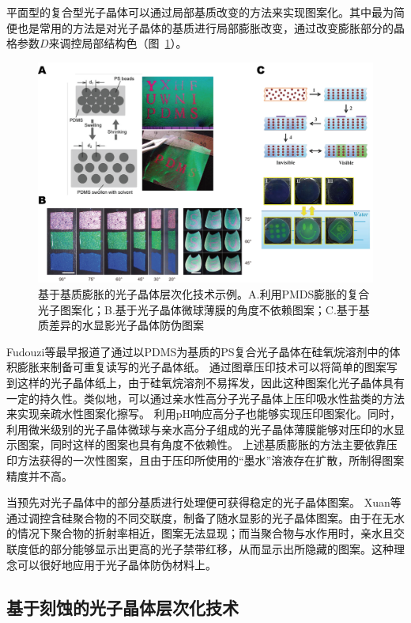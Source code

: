 平面型的复合型光子晶体可以通过局部基质改变的方法来实现图案化。其中最为简便也是常用的方法是对光子晶体的基质进行局部膨胀改变，通过改变膨胀部分的晶格参数$D$来调控局部结构色（图~\ref{fig:matrix_swell}）。
\begin{figure}[b]
	\centering
	\includegraphics[width=0.9\linewidth]{figures/matrix-swell.png}
	\caption{基于基质膨胀的光子晶体层次化技术示例。A.利用PMDS膨胀的复合光子图案化\cite{Fudouzi2003Colloidal}；B.基于光子晶体微球薄膜的角度不依赖图案\cite{Gu2013Tailoring}；C.基于基质差异的水显影光子晶体防伪图案\cite{Xuan2011Invisible}}
	\label{fig:matrix_swell}
\end{figure}
Fudouzi等最早报道了通过以PDMS为基质的PS复合光子晶体在硅氧烷溶剂中的体积膨胀来制备可重复读写的光子晶体纸\cite{Fudouzi2003Colloidal}。
通过图章压印技术可以将简单的图案写到这样的光子晶体纸上，由于硅氧烷溶剂不易挥发，因此这种图案化光子晶体具有一定的持久性。类似地，可以通过亲水性高分子光子晶体上压印吸水性盐类的方法来实现亲疏水性图案化擦写\cite{Ge2009Rewritable}。
利用pH响应高分子也能够实现压印图案化\cite{Liu2007Poly4VinylpyridineBased}。同时，利用微米级别的光子晶体微球与亲水高分子组成的光子晶体薄膜能够对压印的水显示图案\cite{Gu2013Tailoring}，同时这样的图案也具有角度不依赖性。
上述基质膨胀的方法主要依靠压印方法获得的一次性图案，且由于压印所使用的“墨水”溶液存在扩散，所制得图案精度并不高。

当预先对光子晶体中的部分基质进行处理便可获得稳定的光子晶体图案。
Xuan等通过调控含硅聚合物的不同交联度，制备了随水显影的光子晶体图案\cite{Xuan2011Invisible}。由于在无水的情况下聚合物的折射率相近，图案无法显现；而当聚合物与水作用时，亲水且交联度低的部分能够显示出更高的光子禁带红移，从而显示出所隐藏的图案。这种理念可以很好地应用于光子晶体防伪材料上。

\subsection{基于刻蚀的光子晶体层次化技术}
\label{subsec:etch-pattern}

